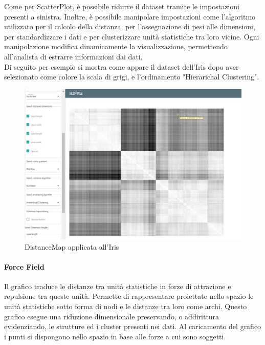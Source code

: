 \documentclass[../manuale_utente.tex]{subfiles}
\begin{document}
Come per ScatterPlot, è possibile ridurre il dataset tramite le impostazioni presenti a sinistra.
Inoltre, è possibile manipolare impostazioni come l'algoritmo utilizzato per il calcolo della distanza, per l'assegnazione di pesi alle dimensioni, per standardizzare i dati e per clusterizzare unità statistiche tra loro vicine. Ogni manipolazione modifica dinamicamente la visualizzazione, permettendo all'analista di estrarre informazioni dai dati.\\
Di seguito per esempio si mostra come appare il dataset dell'Iris dopo aver selezionato come colore la scala di grigi, e l'ordinamento "Hierarichal Clustering".


\begin{figure}[H]
	\centering
	\includegraphics[width=18cm]{src/img/dm/iris_clustering_euclideo_dm.jpg}
	\caption{DistanceMap applicata all'Iris}
\end{figure}


\paragraph{Force Field}
    \label{par:vis_force_field}
Il grafico  traduce le distanze tra unità statistiche in forze di attrazione e repulsione tra queste unità. Permette di rappresentare proiettate nello spazio le unità statistiche sotto forma di nodi e le distanze tra loro come archi. 
Questo grafico esegue una riduzione dimensionale preservando, o addirittura evidenziando, le strutture ed i cluster presenti nei dati.  Al caricamento del grafico i punti si dispongono nello spazio in base alle forze a cui sono soggetti. 
\end{document}
